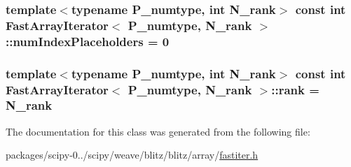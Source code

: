 \subsubsection[{num\+Index\+Placeholders}]{\setlength{\rightskip}{0pt plus 5cm}template$<$typename P\+\_\+numtype, int N\+\_\+rank$>$ const int {\bf Fast\+Array\+Iterator}$<$ P\+\_\+numtype, N\+\_\+rank $>$\+::num\+Index\+Placeholders = 0\hspace{0.3cm}{\ttfamily [static]}}\label{classFastArrayIterator_a6d17ed18a8b7aa110e80ea8c45c07469}
\hypertarget{classFastArrayIterator_a51a4638ef5e68f65172cfbdb764e28ac}{}
\subsubsection[{rank}]{\setlength{\rightskip}{0pt plus 5cm}template$<$typename P\+\_\+numtype, int N\+\_\+rank$>$ const int {\bf Fast\+Array\+Iterator}$<$ P\+\_\+numtype, N\+\_\+rank $>$\+::rank = N\+\_\+rank\hspace{0.3cm}{\ttfamily [static]}}\label{classFastArrayIterator_a51a4638ef5e68f65172cfbdb764e28ac}


The documentation for this class was generated from the following file\+:\begin{DoxyCompactItemize}
\item 
packages/scipy-\/0../scipy/weave/blitz/blitz/array/\hyperlink{fastiter_8h}{fastiter.\+h}\end{DoxyCompactItemize}
